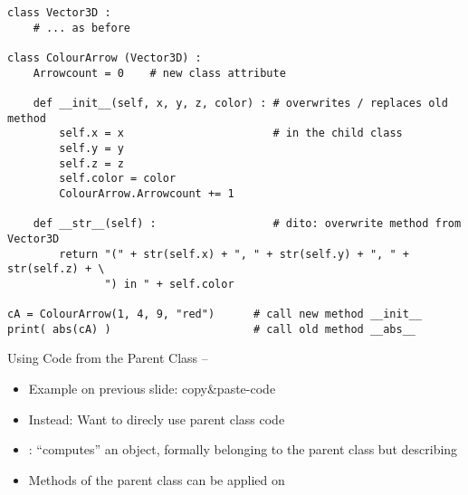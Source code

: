 \begin{frame}[fragile]
%
\begin{codebox}
\begin{verbatim}
class Vector3D :
    # ... as before

class ColourArrow (Vector3D) :
    Arrowcount = 0    # new class attribute
    
    def __init__(self, x, y, z, color) : # overwrites / replaces old method
        self.x = x                       # in the child class
        self.y = y
        self.z = z
        self.color = color
        ColourArrow.Arrowcount += 1
    
    def __str__(self) :                  # dito: overwrite method from Vector3D
        return "(" + str(self.x) + ", " + str(self.y) + ", " + str(self.z) + \
               ") in " + self.color

cA = ColourArrow(1, 4, 9, "red")      # call new method __init__
print( abs(cA) )                      # call old method __abs__
\end{verbatim}
\end{codebox}
%
\end{frame}


\begin{frame}[fragile]{Using Code from the Parent Class -- }
%
\begin{itemize}
\item Example on previous slide: copy\&paste-code
\item Instead: Want to direcly use parent class code
\item {}: \enquote{computes} an object, formally belonging to the parent class but describing 
\item[\Thus] Methods of the parent class can be applied on  \inPy{self}
\end{itemize}
%
\end{frame}


